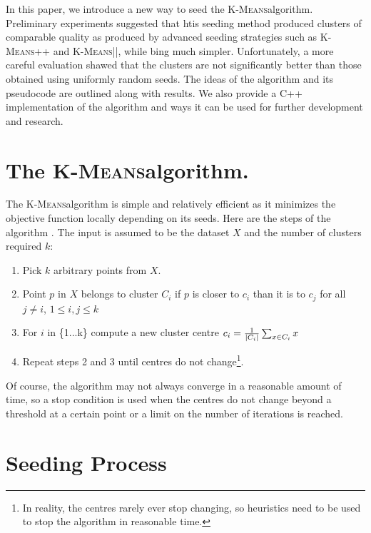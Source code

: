 \documentclass[12pt]{dalthesis}
\newcommand*{\kmeansn}{\textsc{K-Means}} %
\newcommand*{\kmeans}{\kmeansn } %
\DeclarePairedDelimiter\abs{\lvert}{\rvert}
\begin{document}
In this paper, we introduce a new way to seed the \kmeans algorithm. Preliminary experiments suggested that htis seeding method produced clusters of comparable quality as produced by advanced seeding strategies such as \kmeansn++ and \kmeansn||, while bing much simpler. Unfortunately, a more careful evaluation shawed that the clusters are not significantly better than those obtained using uniformly random seeds. The ideas of the algorithm and its pseudocode are outlined along with results. We also provide a C++ implementation of the algorithm and ways it can be used for further development and research.


\section{The \kmeans algorithm.}
The \kmeans algorithm is simple and relatively efficient as it minimizes the objective function locally depending on its seeds.
Here are the steps of the algorithm \citep{arthur2007k}. The input is assumed to be the dataset $X$ and the number of clusters required $k$:

\begin{enumerate}
  \item Pick $k$ arbitrary points from $X$.
  \item Point $p$ in $X$ belongs to cluster $C_i$ if $p$ is closer to $c_i$ than it is to $c_j$ for all $j \neq i$, $1 \leq i,j \leq k$
  \item For $i$ in \{1...k\} compute a new cluster centre $c_i = \frac{1}{\abs{C_i}}\sum_{x \in C_i}x$
  \item Repeat steps 2 and 3 until centres do not change\footnote{In reality, the centres rarely ever stop changing, so heuristics need to be used to stop the algorithm in reasonable time.}.
\end{enumerate}

Of course, the algorithm may not always converge in a reasonable amount of time, so a stop condition is used when the centres do not change beyond a threshold at a certain point or a limit on the number of iterations is reached.

\section{Seeding Process}
\end{document}
